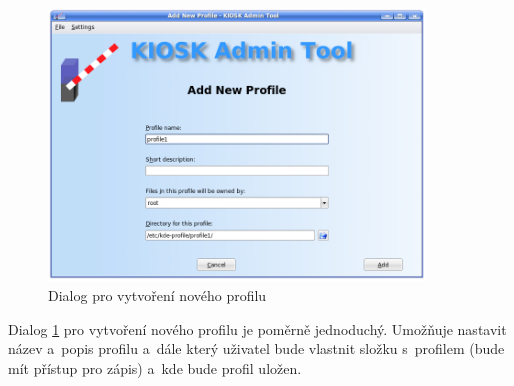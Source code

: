 \begin{figure}[h]
    \centering
    \includegraphics[width=10cm]{obrazky/KioskToolKDE3/novy_profil.png}
    \caption{Dialog pro vytvoření nového profilu}
    \label{fig:kt3_novyprofil}
\end{figure}
Dialog \ref{fig:kt3_novyprofil} pro vytvoření nového profilu je poměrně jednoduchý. Umožňuje nastavit název a~popis profilu a~dále který uživatel bude vlastnit složku s~profilem (bude mít přístup pro zápis) a~kde bude profil uložen.

